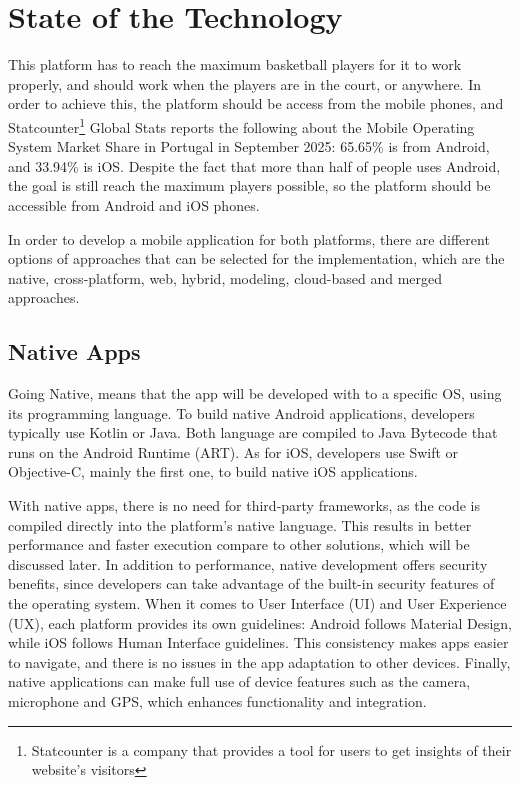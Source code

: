 \section{State of the Technology}\label{sec:state-of-the-technology}

This platform has to reach the maximum basketball players for it to work properly, and should work when the players are in the court, or anywhere.
In order to achieve this, the platform should be access from the mobile phones, and Statcounter\footnote{Statcounter is a company that provides a tool for users to get insights of their website's visitors} Global Stats reports the following about the Mobile Operating System Market Share in Portugal in September 2025: 65.65\% is from Android, and 33.94\% is iOS\cite{statcount}.
Despite the fact that more than half of people uses Android, the goal is still reach the maximum players possible, so the platform should be accessible from Android and iOS phones.

In order to develop a mobile application for both platforms, there are different options of approaches that can be selected for the implementation, which are the native, cross-platform, web, hybrid, modeling, cloud-based and merged approaches\cite{Khachouch2020}.

\subsection{Native Apps}\label{subsec:native-apps}

Going Native, means that the app will be developed with to a specific OS, using its programming language.
To build native Android applications, developers typically use Kotlin or Java.
Both language are compiled to Java Bytecode that runs on the Android Runtime (ART).
As for iOS, developers use Swift or Objective-C, mainly the first one, to build native iOS applications.

With native apps, there is no need for third-party frameworks, as the code is compiled directly into the platform's native language.
This results in better performance and faster execution compare to other solutions, which will be discussed later.
In addition to performance, native development offers security benefits, since developers can take advantage of the built-in security features of the operating system.
When it comes to  User Interface (UI) and User Experience (UX), each platform provides its own guidelines: Android follows Material Design, while iOS follows Human Interface guidelines.
This consistency makes apps easier to navigate, and there is no issues in the app adaptation to other devices.
Finally, native applications can make full use of device features such as the camera, microphone and GPS, which enhances functionality and integration.\cite{Nagy2022}

